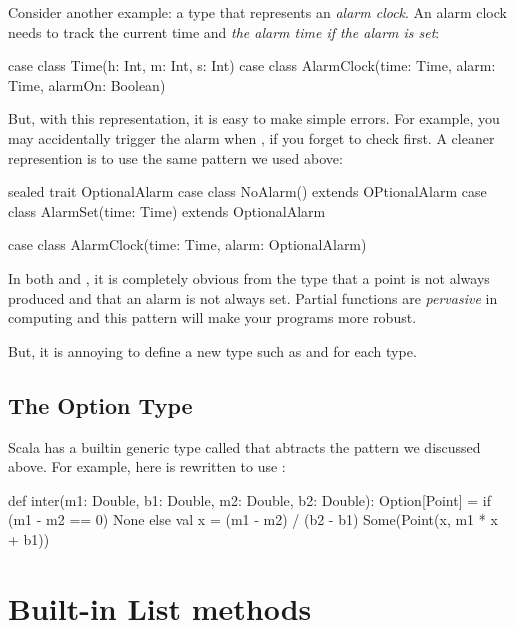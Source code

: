 \documentclass{book}
\begin{document}
Consider another example: a type that represents an \emph{alarm clock}. An alarm
clock needs to track the current time and \emph{the alarm time if the alarm is set}:

\begin{scalacode}
case class Time(h: Int, m: Int, s: Int)
case class AlarmClock(time: Time, alarm: Time, alarmOn: Boolean)
\end{scalacode}

But, with this representation, it is easy to make simple errors. For example,
you may accidentally trigger the alarm when , if you forget
to check  first. A cleaner represention is to use the same pattern we used
above:

\begin{scalacode}
sealed trait OptionalAlarm
case class NoAlarm() extends OPtionalAlarm
case class AlarmSet(time: Time) extends OptionalAlarm

case class AlarmClock(time: Time, alarm: OptionalAlarm)
\end{scalacode}

In both  and , it is completely
obvious from the type that a point is not always produced and that an alarm is
not always set. Partial functions are \emph{pervasive} in computing and this pattern
will make your programs more robust.

But, it is annoying to define a new type such as 
and  for each type.

\subsection{The Option Type}

Scala has a builtin generic type called  that abtracts the
pattern we discussed above. For example, here is  rewritten
to use :

\begin{scalacode}
def inter(m1: Double, b1: Double, m2: Double, b2: Double): Option[Point] = {
  if (m1 - m2 == 0) {
    None
  }
  else {
    val x = (m1 - m2) / (b2 - b1)
    Some(Point(x, m1 * x + b1))
  }
}
\end{scalacode}

\section{Built-in List methods}
\end{document}
